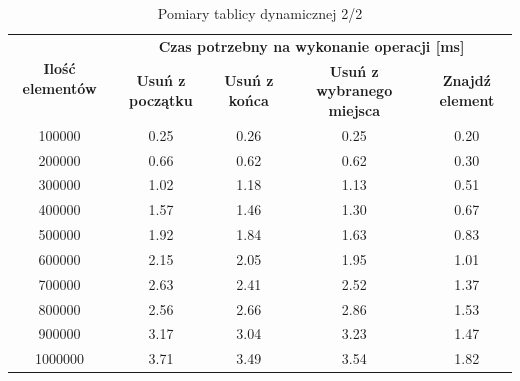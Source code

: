 \documentclass{article}
\begin{document}
    
    \begin{table}[H]
        \centering
        \begin{tabular}{|c|cccc|}
            \hline
            \multirow{2}{*}{\textbf{Ilość   elementów}} & \multicolumn{4}{c|}{\textbf{Czas potrzebny na wykonanie operacji {[}ms{]}}} \\ \cline{2-5} 
             & \multicolumn{1}{c|}{\textbf{Usuń z początku}} & \multicolumn{1}{c|}{\textbf{Usuń z końca}} & \multicolumn{1}{c|}{\textbf{Usuń z wybranego   miejsca}} & \textbf{Znajdź element} \\ \hline
            100000 & \multicolumn{1}{c|}{0.25} & \multicolumn{1}{c|}{0.26} & \multicolumn{1}{c|}{0.25} & 0.20 \\ \hline
            200000 & \multicolumn{1}{c|}{0.66} & \multicolumn{1}{c|}{0.62} & \multicolumn{1}{c|}{0.62} & 0.30 \\ \hline
            300000 & \multicolumn{1}{c|}{1.02} & \multicolumn{1}{c|}{1.18} & \multicolumn{1}{c|}{1.13} & 0.51 \\ \hline
            400000 & \multicolumn{1}{c|}{1.57} & \multicolumn{1}{c|}{1.46} & \multicolumn{1}{c|}{1.30} & 0.67 \\ \hline
            500000 & \multicolumn{1}{c|}{1.92} & \multicolumn{1}{c|}{1.84} & \multicolumn{1}{c|}{1.63} & 0.83 \\ \hline
            600000 & \multicolumn{1}{c|}{2.15} & \multicolumn{1}{c|}{2.05} & \multicolumn{1}{c|}{1.95} & 1.01 \\ \hline
            700000 & \multicolumn{1}{c|}{2.63} & \multicolumn{1}{c|}{2.41} & \multicolumn{1}{c|}{2.52} & 1.37 \\ \hline
            800000 & \multicolumn{1}{c|}{2.56} & \multicolumn{1}{c|}{2.66} & \multicolumn{1}{c|}{2.86} & 1.53 \\ \hline
            900000 & \multicolumn{1}{c|}{3.17} & \multicolumn{1}{c|}{3.04} & \multicolumn{1}{c|}{3.23} & 1.47 \\ \hline
            1000000 & \multicolumn{1}{c|}{3.71} & \multicolumn{1}{c|}{3.49} & \multicolumn{1}{c|}{3.54} & 1.82 \\ \hline
        \end{tabular}
        \caption{Pomiary tablicy dynamicznej 2/2}
    \end{table}
\end{document}

